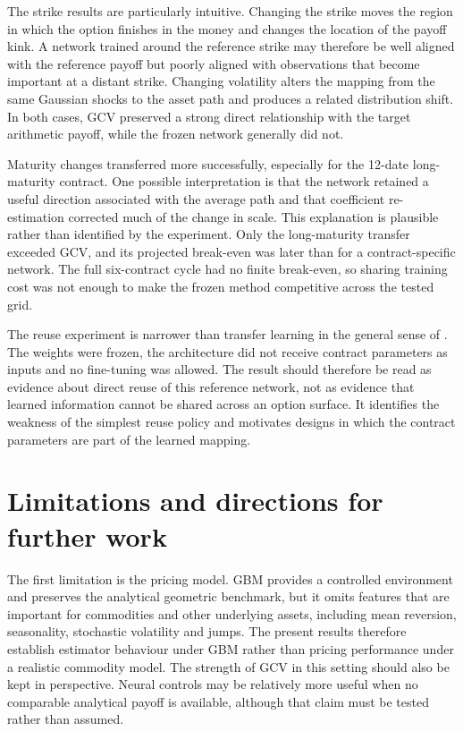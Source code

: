 The strike results are particularly intuitive. Changing the strike moves the region in which the option finishes in the money and changes the location of the payoff kink. A network trained around the reference strike may therefore be well aligned with the reference payoff but poorly aligned with observations that become important at a distant strike. Changing volatility alters the mapping from the same Gaussian shocks to the asset path and produces a related distribution shift. In both cases, GCV preserved a strong direct relationship with the target arithmetic payoff, while the frozen network generally did not.

Maturity changes transferred more successfully, especially for the 12-date long-maturity contract. One possible interpretation is that the network retained a useful direction associated with the average path and that coefficient re-estimation corrected much of the change in scale. This explanation is plausible rather than identified by the experiment. Only the long-maturity transfer exceeded GCV, and its projected break-even was later than for a contract-specific network. The full six-contract cycle had no finite break-even, so sharing training cost was not enough to make the frozen method competitive across the tested grid.

The reuse experiment is narrower than transfer learning in the general sense of \textcite{pan_yang_2010}. The weights were frozen, the architecture did not receive contract parameters as inputs and no fine-tuning was allowed. The result should therefore be read as evidence about direct reuse of this reference network, not as evidence that learned information cannot be shared across an option surface. It identifies the weakness of the simplest reuse policy and motivates designs in which the contract parameters are part of the learned mapping.

\section{Limitations and directions for further work}

The first limitation is the pricing model. GBM provides a controlled environment and preserves the analytical geometric benchmark, but it omits features that are important for commodities and other underlying assets, including mean reversion, seasonality, stochastic volatility and jumps. The present results therefore establish estimator behaviour under GBM rather than pricing performance under a realistic commodity model. The strength of GCV in this setting should also be kept in perspective. Neural controls may be relatively more useful when no comparable analytical payoff is available, although that claim must be tested rather than assumed.

